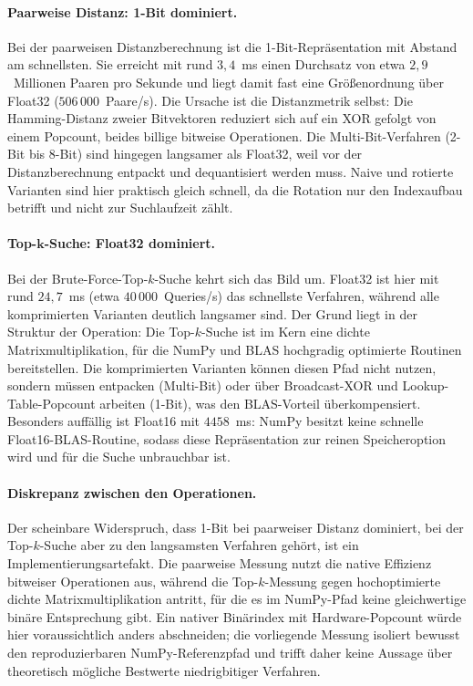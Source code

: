 \paragraph{Paarweise Distanz: 1-Bit dominiert.}
Bei der paarweisen Distanzberechnung ist die 1-Bit-Repräsentation mit Abstand am schnellsten.
Sie erreicht mit rund $3{,}4$~ms einen Durchsatz von etwa $2{,}9$~Millionen Paaren pro Sekunde und liegt damit fast eine Größenordnung über Float32 ($506\,000$~Paare/s).
Die Ursache ist die Distanzmetrik selbst: Die Hamming-Distanz zweier Bitvektoren reduziert sich auf ein XOR gefolgt von einem Popcount, beides billige bitweise Operationen.
Die Multi-Bit-Verfahren (2-Bit bis 8-Bit) sind hingegen langsamer als Float32, weil vor der Distanzberechnung entpackt und dequantisiert werden muss.
Naive und rotierte Varianten sind hier praktisch gleich schnell, da die Rotation nur den Indexaufbau betrifft und nicht zur Suchlaufzeit zählt.
%
\paragraph{Top-$\boldsymbol{k}$-Suche: Float32 dominiert.}
Bei der Brute-Force-Top-$k$-Suche kehrt sich das Bild um.
Float32 ist hier mit rund $24{,}7$~ms (etwa $40\,000$~Queries/s) das schnellste Verfahren, während alle komprimierten Varianten deutlich langsamer sind.
Der Grund liegt in der Struktur der Operation: Die Top-$k$-Suche ist im Kern eine dichte Matrixmultiplikation, für die NumPy und BLAS hochgradig optimierte Routinen bereitstellen.
Die komprimierten Varianten können diesen Pfad nicht nutzen, sondern müssen entpacken (Multi-Bit) oder über Broadcast-XOR und Lookup-Table-Popcount arbeiten (1-Bit), was den BLAS-Vorteil überkompensiert.
Besonders auffällig ist Float16 mit $4458$~ms: NumPy besitzt keine schnelle Float16-BLAS-Routine, sodass diese Repräsentation zur reinen Speicheroption wird und für die Suche unbrauchbar ist.
%
\paragraph{Diskrepanz zwischen den Operationen.}
Der scheinbare Widerspruch, dass 1-Bit bei paarweiser Distanz dominiert, bei der Top-$k$-Suche aber zu den langsamsten Verfahren gehört, ist ein Implementierungsartefakt.
Die paarweise Messung nutzt die native Effizienz bitweiser Operationen aus, während die Top-$k$-Messung gegen hochoptimierte dichte Matrixmultiplikation antritt, für die es im NumPy-Pfad keine gleichwertige binäre Entsprechung gibt.
Ein nativer Binärindex mit Hardware-Popcount würde hier voraussichtlich anders abschneiden; die vorliegende Messung isoliert bewusst den reproduzierbaren NumPy-Referenzpfad und trifft daher keine Aussage über theoretisch mögliche Bestwerte niedrigbitiger Verfahren.
%
